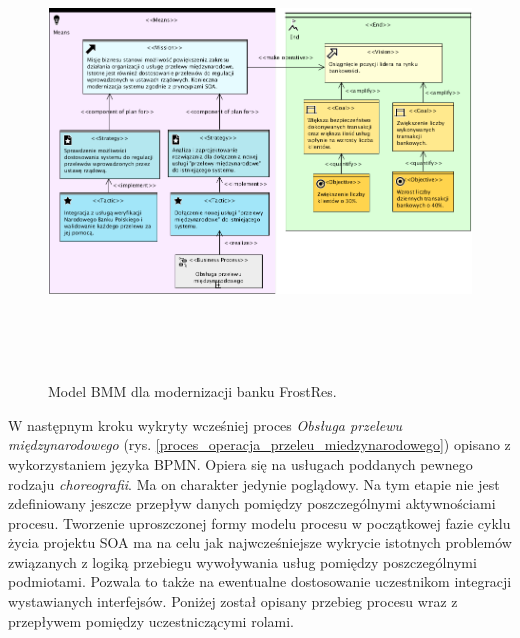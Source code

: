 \begin{figure}[h!tbp]
\begin{centering}
\includegraphics[width=16cm, height=12cm]{img/bmm_model_frostres.png}
\caption[Model BMM dla modernizacji banku FrostRes]{Model BMM dla modernizacji banku FrostRes.}\label{BMM_frostres}
\end{centering}
\end{figure}

W następnym kroku wykryty wcześniej proces \emph{Obsługa przelewu międzynarodowego} (rys. \ref{proces_operacja_przeleu_miedzynarodowego}) opisano z wykorzystaniem języka BPMN. Opiera się na usługach poddanych pewnego rodzaju \emph{choreografii}. Ma on charakter jedynie poglądowy. Na tym etapie nie jest zdefiniowany jeszcze przepływ danych pomiędzy poszczególnymi aktywnościami procesu. Tworzenie uproszczonej formy modelu procesu w początkowej fazie cyklu życia projektu SOA ma na celu jak najwcześniejsze wykrycie istotnych problemów związanych z logiką przebiegu wywoływania usług pomiędzy poszczególnymi podmiotami. Pozwala to także na ewentualne dostosowanie uczestnikom integracji wystawianych interfejsów. Poniżej został opisany przebieg procesu wraz z przepływem pomiędzy uczestniczącymi rolami.

